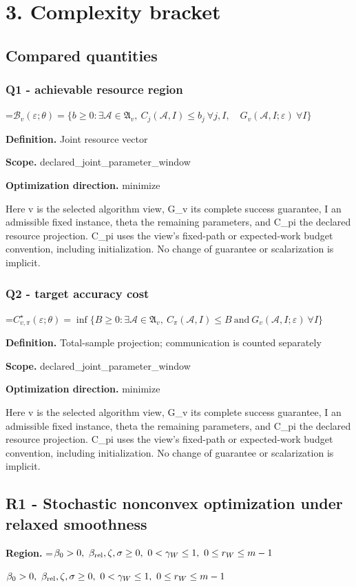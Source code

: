 \documentclass[10pt,a4paper]{article}
\newcommand{\AtlasMath}[1]{\par\begingroup\centering\setbox0=\hbox{$\displaystyle #1$}\ifdim\wd0>1.4\linewidth\typeout{ATLAS WIDE FORMULA: \the\wd0}\fi\ifdim\wd0>\linewidth\resizebox{\linewidth}{!}{\box0}\else\box0\fi\par\endgroup}
\newcommand{\AtlasInlineMath}[1]{\begingroup\setbox0=\hbox{$#1$}\ifdim\wd0>.4\linewidth\endgroup\AtlasMath{#1}\else\endgroup$#1$\fi}
\begin{document}
\section{3. Complexity bracket}
\subsection{Compared quantities}
\subsubsection{Q1 - achievable resource region}
\AtlasMath{\mathcal B_v(\varepsilon;\theta)=\{b\ge0:\exists\mathcal A\in\mathfrak A_v,\ C_j(\mathcal A,I)\le b_j\ \forall j,I,\quad G_v(\mathcal A,I;\varepsilon)\ \forall I\}}
\textbf{Definition.} Joint resource vector

\textbf{Scope.} declared\_joint\_parameter\_window

\textbf{Optimization direction.} minimize

Here v is the selected algorithm view, G\_v its complete success guarantee, I an admissible fixed instance, theta the remaining parameters, and C\_pi the declared resource projection. C\_pi uses the view's fixed-path or expected-work budget convention, including initialization. No change of guarantee or scalarization is implicit.

\subsubsection{Q2 - target accuracy cost}
\AtlasMath{C^\star_{v,\pi}(\varepsilon;\theta)=\inf\{B\ge0:\exists\mathcal A\in\mathfrak A_v,\ C_\pi(\mathcal A,I)\le B\ \text{and}\ G_v(\mathcal A,I;\varepsilon)\ \forall I\}}
\textbf{Definition.} Total-sample projection; communication is counted separately

\textbf{Scope.} declared\_joint\_parameter\_window

\textbf{Optimization direction.} minimize

Here v is the selected algorithm view, G\_v its complete success guarantee, I an admissible fixed instance, theta the remaining parameters, and C\_pi the declared resource projection. C\_pi uses the view's fixed-path or expected-work budget convention, including initialization. No change of guarantee or scalarization is implicit.

\subsection{R1 - Stochastic nonconvex optimization under relaxed smoothness}
\textbf{Region.} \AtlasInlineMath{\beta_0>0,\ \beta_{\rm rel},\zeta,\sigma\ge0,\ 0<\gamma_W\le1,\ 0\le r_W\le m-1}
\end{document}

